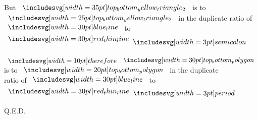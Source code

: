 \documentclass[12pt,preview]{standalone}
\begin{document}
\begin{minipage}[t]{0.64\textwidth}
    \hfill

    \begin{center}
        But $\img[0][0][35]{top_bottom_yellow_triangle_2}$ is to $\img{top_bottom_yellow_triangle_2}$ in the duplicate ratio of\\
        $\blueline$ to $\redthinline \bsemicolon$\\
        \hfill\\
        $\btherefore \img[0][0][30]{top_bottom_polygon}$ is to $\img[0][0][20]{top_bottom_polygon}$ in the duplicate\\
        ratio of $\blueline$ to $\redthinline \bperiod$
    \end{center}

    \hfill

    \hfill Q.E.D.
\end{minipage}
\end{document}
